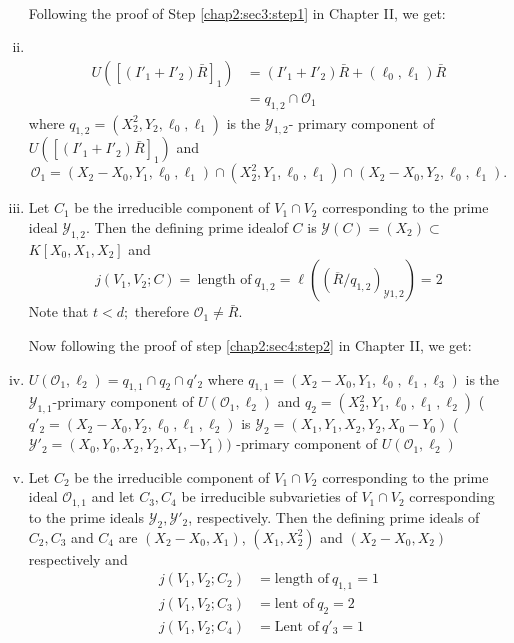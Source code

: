 \begin{example}
\begin{enumerate}[(i)]
\begin{align*}
  \end{align*}
  Following the proof of Step \ref{chap2:sec3:step1} in Chapter II, we get:
\item ~
\vskip -1.4cm
  \begin{align*}
    U([(I'_1 + I'_2)\bar{R}]_1) &= (I'_1 + I'_2)\bar{R} +
    (\ell_0,\ell_1)\bar{R}\\ 
    & = q_{1,2}\cap \mathscr{O}_1
  \end{align*}
  where $q_{1,2} = (X^2_2,Y_2,\ell_0,\ell_1)$ is the
  $\mathscr{Y}_{1,2}$- primary component of $U([(I'_1+
    I'_2)\bar{R}]_1)$ and  
  $$
  \mathscr{O}_1 = (X_2-X_0,Y_1,\ell_0,\ell_1)\cap
  (X^2_2,Y_1,\ell_0,\ell_1) \cap (X_2-X_0,Y_2,\ell_0,\ell_1).
  $$ 
\item Let $C_1$ be the irreducible component of $V_1 \cap V_2$
  corresponding to the prime ideal $\mathscr{Y}_{1,2}$. Then the
  defining prime ideal\pageoriginale of $C$ is $\mathscr{Y}(C) = (X_2) \subset$
  $K[X_0, X_1, X_2]$ and 
  $$
  j(V_1,V_2;C) = ~\text{length of}~ q_{1,2} = \ell
  ((\overline{R}/q_{1,2})_{\mathscr{Y}1,2}) = 2
  $$
  Note that $t < d;$ therefore $\mathscr{O}_1 \neq \bar{R}$.
  
  Now following the proof of step \ref{chap2:sec4:step2} in Chapter
  II, we get:  
  
\item $U(\mathscr{O}_1, \ell_2)=q_{1,1} \cap q_2 \cap q'_2$ where 
  $q_{1,1} = (X_2 -X_0, Y_1, \ell_0, \ell_1,\ell_3)$ is the
  $\mathscr{Y}_{1,1}$-primary component of $U (\mathscr{O}_1,
  \ell_2)$ and $q_2 =(X{^2_2},Y_1, \ell_0, \ell_1, \ell_2)$ (\resp 
  $q'_2=(X_2-X_0,Y_2,\ell_0, \ell_1, \ell_2)$ is
  $\mathscr{Y}_2=(X_1, Y_1, X_2, Y_2, X_0-Y_0)$ (\resp  
  $ \mathscr{Y}'_{2} = (X_0, Y_0, X_2,Y_2,X_1,-Y_1))$ -primary
  component of $U (\mathscr{O}_1,\ell_2)$ 
\item Let $C_2$ be the irreducible component of $V_1 \cap V_2$
  corresponding to the prime ideal $\mathscr{O}_{1,1}$ and let
  $C_3, C_4$ be irreducible subvarieties of $V_1 \cap V_2$
  corresponding to the prime ideals $\mathscr{Y}_2,\mathscr{Y}'_2$,
  respectively. Then the defining prime ideals of $C_2, C_3$ and
  $C_4$ are $(X_2 -X_0, X_1)$, $(X_1, X_2^2)$ and $(X_2 -X_0,X_2)$
  respectively and 
  \begin{align*}
    j(V_1,V_2;C_2)& = \text{length of}~ q_{1,1} = 1\\
    j(V_1,V_2;C_3) &= \text{lent of}~ q_2 = 2\\
    j(V_1,V_2;C_4) &= \text{Lent of}~ q'_3 = 1
  \end{align*} 
  

\end{enumerate}
\end{example}
